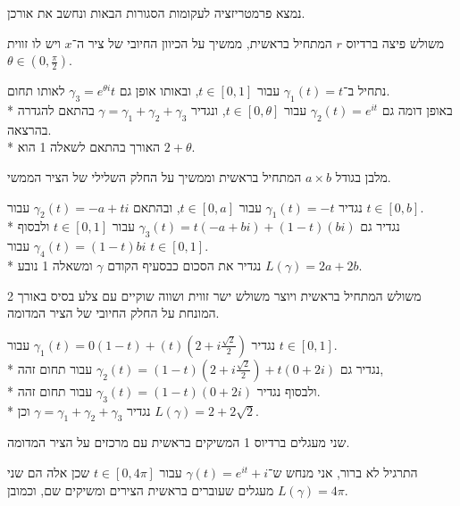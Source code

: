 \question{}
נמצא פרמטריזציה לעקומות הסגורות הבאות ונחשב את אורכן.

\subquestion{}
משולש פיצה ברדיוס $r$ המתחיל בראשית, ממשיך על הכיוון החיובי של ציר ה־$x$ ויש לו זווית $\theta \in (0, \frac{\pi}{2})$.
\begin{solution}
	נתחיל ב־$\gamma_1(t) = t$ עבור $t \in [0, 1]$, ובאותו אופן גם $\gamma_3 = e^{\theta i} t$ לאותו תחום. \\*
	באופן דומה גם $\gamma_2(t) = e^{it}$ עבור $t \in [0, \theta]$, ונגדיר $\gamma = \gamma_1 + \gamma_2 + \gamma_3$ בהתאם להגדרה בהרצאה. \\*
	האורך בהתאם לשאלה 1 הוא $2 + \theta$.
\end{solution}

\subquestion{}
מלבן בגודל $a \times b$ המתחיל בראשית וממשיך על החלק השלילי של הציר הממשי.
\begin{solution}
	נגדיר $\gamma_1(t) = -t$ עבור $t \in [0, a]$, ובהתאם $\gamma_2(t) = -a + ti$ עבור $t \in [0, b]$. \\*
	נגדיר גם $\gamma_3(t) = t(-a + bi) + (1 - t)(bi)$ עבור $t \in [0, 1]$ ולבסוף $\gamma_4(t) = (1 - t) bi$ עבור $t \in [0, 1]$. \\*
	נגדיר את הסכום כבסעיף הקודם $\gamma$ ומשאלה 1 נובע $L(\gamma) = 2a + 2b$.
\end{solution}

\subquestion{}
משולש המתחיל בראשית ויוצר משולש ישר זווית ושווה שוקיים עם צלע בסיס באורך 2 המונחת על החלק החיובי של הציר המדומה.
\begin{solution}
	נגדיר $\gamma_1(t) = 0(1 - t) + (t)(2 + i \frac{\sqrt{2}}{2})$ עבור $t \in [0, 1]$. \\*
	נגדיר גם $\gamma_2(t) = (1  - t)(2 + i \frac{\sqrt{2}}{2}) + t (0 + 2i)$ עבור תחום זהה, \\*
	ולבסוף נגדיר $\gamma_3(t) = (1 - t) (0 + 2i)$ עבור תחום זהה. \\*
	נגדיר $\gamma = \gamma_1 + \gamma_2 + \gamma_3$ וכן $L(\gamma) = 2 + 2 \sqrt{2}$.
\end{solution}

\subquestion{}
שני מעגלים ברדיוס 1 המשיקים בראשית עם מרכזים על הציר המדומה.
\begin{solution}
	התרגיל לא ברור, אני מנחש ש־$\gamma(t) = e^{it} + i$ עבור $t \in [0, 4\pi]$ שכן אלה הם שני מעגלים שעוברים בראשית הצירים ומשיקים שם, וכמובן $L(\gamma) = 4\pi$.
\end{solution}

